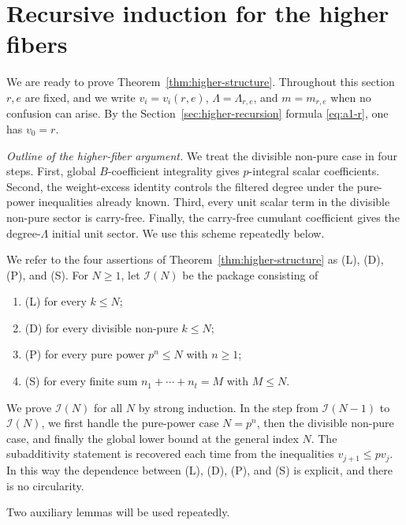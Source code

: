 \documentclass[11pt]{amsart}
\numberwithin{equation}{section}
\begin{document}
\section{Recursive induction for the higher fibers}\label{sec:higher-induction}
We are ready to prove Theorem~\ref{thm:higher-structure}.  Throughout this section $r,e$ are fixed, and we write $v_i=v_i(r,e)$, $\Lambda=\Lambda_{r,e}$, and $m=m_{r,e}$ when no confusion can arise.  By the Section~\ref{sec:higher-recursion} formula \eqref{eq:a1-r}, one has $v_0=r$.

\medskip
\noindent\emph{Outline of the higher-fiber argument.}
We treat the divisible non-pure case in four steps.  First, global $B$-coefficient integrality gives $p$-integral scalar coefficients.  Second, the weight-excess identity controls the filtered degree under the pure-power inequalities already known.  Third, every unit scalar term in the divisible non-pure sector is carry-free.  Finally, the carry-free cumulant coefficient gives the degree-$\Lambda$ initial unit sector.  We use this scheme repeatedly below.

We refer to the four assertions of Theorem~\ref{thm:higher-structure} as (L), (D), (P), and (S).  For $N\ge1$, let $\mathcal I(N)$ be the package consisting of
\begin{enumerate}[label=\textup{(\arabic*)},leftmargin=2.2em]
\item (L) for every $k\le N$;
\item (D) for every divisible non-pure $k\le N$;
\item (P) for every pure power $p^n\le N$ with $n\ge1$;
\item (S) for every finite sum $n_1+\cdots+n_t=M$ with $M\le N$.
\end{enumerate}
We prove $\mathcal I(N)$ for all $N$ by strong induction.  In the step from $\mathcal I(N-1)$ to $\mathcal I(N)$, we first handle the pure-power case $N=p^n$, then the divisible non-pure case, and finally the global lower bound at the general index $N$.  The subadditivity statement is recovered each time from the inequalities $v_{j+1}\le p v_j$.  In this way the dependence between (L), (D), (P), and (S) is explicit, and there is no circularity.

Two auxiliary lemmas will be used repeatedly.
\end{document}
